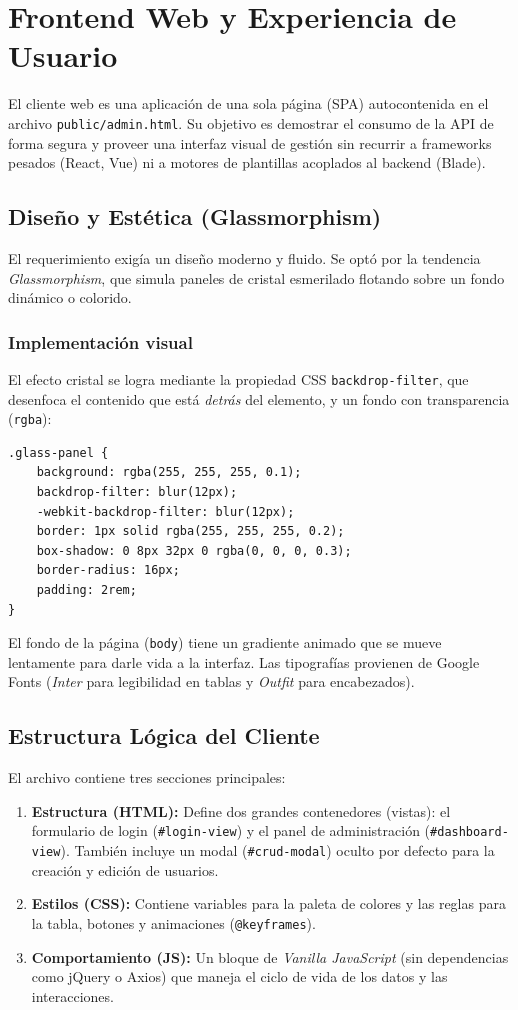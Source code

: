 \section{Frontend Web y Experiencia de Usuario}
\label{sec:frontend}
El cliente web es una aplicación de una sola página (SPA) autocontenida en el archivo \texttt{public/admin.html}. Su objetivo es demostrar el consumo de la API de forma segura y proveer una interfaz visual de gestión sin recurrir a frameworks pesados (React, Vue) ni a motores de plantillas acoplados al backend (Blade).

\subsection{Diseño y Estética (Glassmorphism)}
El requerimiento exigía un diseño moderno y fluido. Se optó por la tendencia \emph{Glassmorphism}, que simula paneles de cristal esmerilado flotando sobre un fondo dinámico o colorido.

\subsubsection{Implementación visual}
El efecto cristal se logra mediante la propiedad CSS \texttt{backdrop-filter}, que desenfoca el contenido que está \emph{detrás} del elemento, y un fondo con transparencia (\texttt{rgba}):
\begin{lstlisting}[language=html, caption={Estilo base para los paneles translúcidos}]
.glass-panel {
    background: rgba(255, 255, 255, 0.1);
    backdrop-filter: blur(12px);
    -webkit-backdrop-filter: blur(12px);
    border: 1px solid rgba(255, 255, 255, 0.2);
    box-shadow: 0 8px 32px 0 rgba(0, 0, 0, 0.3);
    border-radius: 16px;
    padding: 2rem;
}
\end{lstlisting}
El fondo de la página (\texttt{body}) tiene un gradiente animado que se mueve lentamente para darle vida a la interfaz. Las tipografías provienen de Google Fonts (\emph{Inter} para legibilidad en tablas y \emph{Outfit} para encabezados).

\subsection{Estructura Lógica del Cliente}
El archivo contiene tres secciones principales:
\begin{enumerate}
    \item \textbf{Estructura (HTML):} Define dos grandes contenedores (vistas): el formulario de login (\texttt{\#login-view}) y el panel de administración (\texttt{\#dashboard-view}). También incluye un modal (\texttt{\#crud-modal}) oculto por defecto para la creación y edición de usuarios.
    \item \textbf{Estilos (CSS):} Contiene variables para la paleta de colores y las reglas para la tabla, botones y animaciones (\texttt{@keyframes}).
    \item \textbf{Comportamiento (JS):} Un bloque de \emph{Vanilla JavaScript} (sin dependencias como jQuery o Axios) que maneja el ciclo de vida de los datos y las interacciones.
\end{enumerate}

